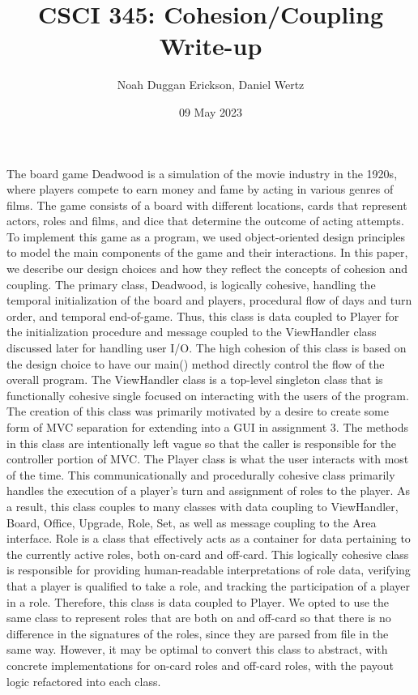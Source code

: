 \documentclass[letterpaper, twoside]{report}
\title{CSCI 345: Cohesion/Coupling Write-up}
\author{Noah Duggan Erickson, Daniel Wertz}
\date{09 May 2023}
\begin{document}
\maketitle

The board game Deadwood is a simulation of the movie industry in the 1920s, where players compete to earn money and fame by acting in various genres of films. The game consists of a board with different locations, cards that represent actors, roles and films, and dice that determine the outcome of acting attempts. To implement this game as a program, we used object-oriented design principles to model the main components of the game and their interactions. In this paper, we describe our design choices and how they reflect the concepts of cohesion and coupling.
The primary class, Deadwood, is logically cohesive, handling the temporal initialization of the board and players, procedural flow of days and turn order, and temporal end-of-game. Thus, this class is data coupled to Player for the initialization procedure and message coupled to the ViewHandler  class discussed later for handling user I/O. The high cohesion of this class is based on the design choice to have our main() method directly control the flow of the overall program. 
The ViewHandler class is a top-level singleton class that is functionally cohesive single focused on interacting with the users of the program. The creation of this class was primarily motivated by a desire to create some form of MVC separation for extending into a GUI in assignment 3. The methods in this class are intentionally left vague so that the caller is responsible for the controller portion of MVC.
The Player class is what the user interacts with most of the time. This communicationally and procedurally cohesive class primarily handles the execution of a player’s turn  and assignment of roles to the player. As a result, this class couples to many classes with data coupling to ViewHandler, Board, Office, Upgrade, Role, Set, as well as message coupling to the Area interface.
Role is a class that effectively acts as a container for data pertaining to the currently active roles, both on-card and off-card. This logically cohesive class is responsible for providing human-readable interpretations of role data, verifying that a player is qualified to take a role, and tracking the participation of a player in a role. Therefore, this class is data coupled to Player. We opted to use the same class to represent roles that are both on and off-card so that there is no difference in the signatures of the roles, since they are parsed from file in the same way. However, it may be optimal to convert this class to abstract, with concrete implementations for on-card roles and off-card roles, with the payout logic refactored into each class.
\end{document}
